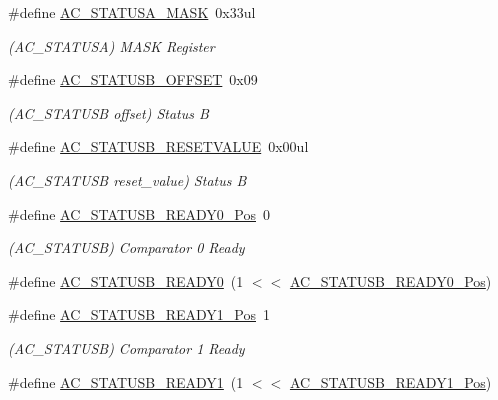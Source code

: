 \begin{DoxyCompactItemize}
\item 
\#define \mbox{\hyperlink{group___s_a_m_d21___a_c_ga85081ed7ee5f3dd1a625b6e4aff72be5}{A\+C\+\_\+\+S\+T\+A\+T\+U\+S\+A\+\_\+\+M\+A\+SK}}~0x33ul
\begin{DoxyCompactList}\small\item\em (A\+C\+\_\+\+S\+T\+A\+T\+U\+SA) M\+A\+SK Register \end{DoxyCompactList}\item 
\#define \mbox{\hyperlink{group___s_a_m_d21___a_c_ga61e64bbbcd8d070e127dc143ac1badf7}{A\+C\+\_\+\+S\+T\+A\+T\+U\+S\+B\+\_\+\+O\+F\+F\+S\+ET}}~0x09
\begin{DoxyCompactList}\small\item\em (A\+C\+\_\+\+S\+T\+A\+T\+U\+SB offset) Status B \end{DoxyCompactList}\item 
\#define \mbox{\hyperlink{group___s_a_m_d21___a_c_ga35348c0f09306ec32f756769f1c8544b}{A\+C\+\_\+\+S\+T\+A\+T\+U\+S\+B\+\_\+\+R\+E\+S\+E\+T\+V\+A\+L\+UE}}~0x00ul
\begin{DoxyCompactList}\small\item\em (A\+C\+\_\+\+S\+T\+A\+T\+U\+SB reset\+\_\+value) Status B \end{DoxyCompactList}\item 
\#define \mbox{\hyperlink{group___s_a_m_d21___a_c_ga0d6d9dbdd414988aaf79e423983fc8a0}{A\+C\+\_\+\+S\+T\+A\+T\+U\+S\+B\+\_\+\+R\+E\+A\+D\+Y0\+\_\+\+Pos}}~0
\begin{DoxyCompactList}\small\item\em (A\+C\+\_\+\+S\+T\+A\+T\+U\+SB) Comparator 0 Ready \end{DoxyCompactList}\item 
\#define \mbox{\hyperlink{group___s_a_m_d21___a_c_ga0ccf55bc5dabce6c5cef0b655b3e43b7}{A\+C\+\_\+\+S\+T\+A\+T\+U\+S\+B\+\_\+\+R\+E\+A\+D\+Y0}}~(1 $<$$<$ \mbox{\hyperlink{group___s_a_m_d21___a_c_ga0d6d9dbdd414988aaf79e423983fc8a0}{A\+C\+\_\+\+S\+T\+A\+T\+U\+S\+B\+\_\+\+R\+E\+A\+D\+Y0\+\_\+\+Pos}})
\item 
\#define \mbox{\hyperlink{group___s_a_m_d21___a_c_gac6991f3944dc31c5897b9fef7107b25d}{A\+C\+\_\+\+S\+T\+A\+T\+U\+S\+B\+\_\+\+R\+E\+A\+D\+Y1\+\_\+\+Pos}}~1
\begin{DoxyCompactList}\small\item\em (A\+C\+\_\+\+S\+T\+A\+T\+U\+SB) Comparator 1 Ready \end{DoxyCompactList}\item 
\#define \mbox{\hyperlink{group___s_a_m_d21___a_c_gae68c7689a9c78196751f5157939e4100}{A\+C\+\_\+\+S\+T\+A\+T\+U\+S\+B\+\_\+\+R\+E\+A\+D\+Y1}}~(1 $<$$<$ \mbox{\hyperlink{group___s_a_m_d21___a_c_gac6991f3944dc31c5897b9fef7107b25d}{A\+C\+\_\+\+S\+T\+A\+T\+U\+S\+B\+\_\+\+R\+E\+A\+D\+Y1\+\_\+\+Pos}})

\end{DoxyCompactItemize}
